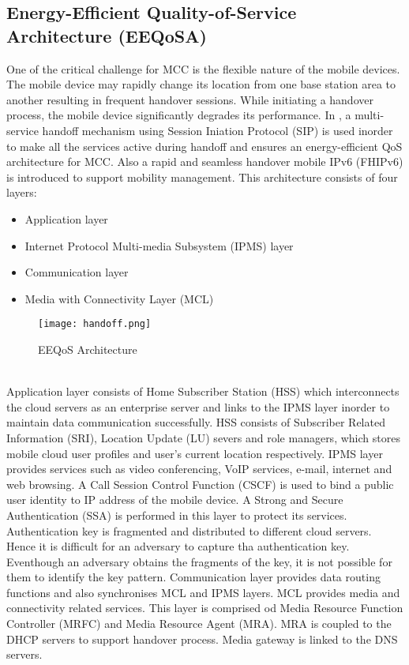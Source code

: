 \documentclass[10pt,a4paper,journal]{IEEEtran}
\begin{document}
\subsection{Energy-Efficient Quality-of-Service Architecture (EEQoSA)}
 One of the critical challenge for MCC is the flexible nature of the mobile devices. The mobile device may rapidly change its location from one base station area to another resulting in frequent handover sessions. While initiating a handover process, the mobile device significantly degrades its performance. In \cite{3}, a multi-service handoff mechanism using Session Iniation Protocol (SIP) is used inorder to make all the services active during handoff and ensures an energy-efficient QoS \cite{14} architecture for MCC. Also a rapid and seamless handover mobile IPv6 (FHIPv6) is introduced to support mobility management. This architecture consists of four layers:\\
\begin{itemize}
\item Application layer
\item Internet Protocol Multi-media Subsystem (IPMS) layer
\item Communication layer
\item Media with Connectivity Layer (MCL)
\end{itemize}
\begin{figure}[htbp]
\centering
\texttt{[image: handoff.png]} 
\caption{EEQoS Architecture \cite{3}}
\label{8}
\end{figure}\\
\hspace*{2em} Application layer consists of Home Subscriber Station (HSS) which interconnects the cloud servers as an enterprise server and links to the IPMS layer  inorder to maintain data communication successfully. HSS consists of Subscriber Related Information (SRI), Location Update (LU) severs and role managers, which stores mobile cloud user profiles and user's current location respectively. IPMS layer provides services such as video conferencing, VoIP services, e-mail, internet and web browsing. A Call Session Control Function (CSCF) is used to bind a public user identity to IP address of the mobile device. A Strong and Secure Authentication (SSA) is performed in this layer to protect its services. Authentication key is fragmented and distributed to different cloud servers. Hence it is difficult for an adversary to capture tha authentication key. Eventhough an adversary obtains the fragments of the key, it is not possible for them to identify the key pattern. Communication layer provides data routing functions and also synchronises MCL and IPMS layers. MCL provides media and connectivity related services. This layer is comprised od Media Resource Function Controller (MRFC) and Media Resource Agent (MRA). MRA is coupled to the DHCP servers to support handover process. Media gateway is linked to the DNS servers. \\
\end{document}
